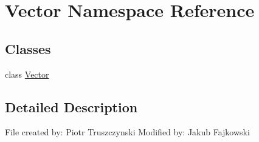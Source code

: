 \hypertarget{namespaceVector}{}\section{Vector Namespace Reference}
\label{namespaceVector}
\subsection*{Classes}
\begin{DoxyCompactItemize}
\item 
class \hyperlink{classVector_1_1Vector}{Vector}
\end{DoxyCompactItemize}


\subsection{Detailed Description}
\begin{DoxyVerb}File created by: Piotr Truszczynski
Modified by: Jakub Fajkowski
\end{DoxyVerb}
 